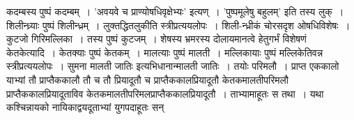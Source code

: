 \documentclass[11pt, openany]{book}
\begin{document}
\begin{sloppypar}
कदम्बस्य पुष्पं कदम्बम्~। {\color{violet}'अवयवे च प्राण्योषधिवृक्षेभ्यः'} इत्यण्~। {\color{violet}'पुष्पमूलेषु बहुलम्'} इति तस्य लुक्~। शिलीन्ध्र्याः पुष्पं शिलीन्ध्रम्~। {\color{violet}लुक्तद्धितलुकी}ति स्त्रीप्रत्ययलोपः~। शिली-न्ध्रीकं चोरसदृश ओषधिविशेषः~। कुटजो गिरिमल्लिका~। तस्य पुष्पं कुटजम्~। शेषस्य भ्रमरस्य दोलायमानत्वे हेतुगर्भं विशेषणं केतकेत्यादि~। केतक्याः पुष्पं केतकम्~। मालत्याः पुष्पं मालती~। मल्लिकायाः पुष्पं मल्लिकेतिवन्न स्त्रीप्रत्ययलोपः~। सुमना मालती जातिः इत्यभिधानान्मालती जातिः~। तयोः परिमलौ~। प्राप्त एककालो याभ्यां तौ प्राप्तैककालौ तौ च तौ प्रियादूतौ च प्राप्तैककालप्रियादूतौ केतकमालतीपरिमलौ प्राप्तैककालप्रियादूताविव केतकमालतीपरिमलप्राप्तैककालप्रियादूतौ~। ताभ्यामाहूतः स तथा~। यथा कश्चिन्नायको नायिकाद्वयदूताभ्यां युगपदाहूतः सन्
\end{sloppypar}

\newpage
\end{document}
